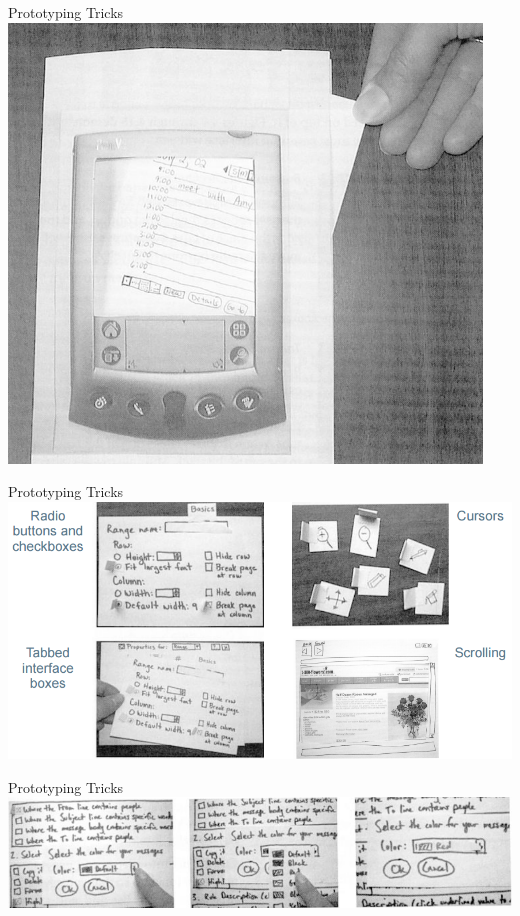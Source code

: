 \documentclass[10pt]{beamer}
\begin{document}
\begin{frame}{Prototyping Tricks}
\centering
	\includegraphics[width=\linewidth]{img/pagessketch.png}
\end{frame}

\begin{frame}{Prototyping Tricks}
\centering
	\includegraphics[width=\linewidth]{img/sketchtricks.png}
\end{frame}

\begin{frame}{Prototyping Tricks}
\centering
	\includegraphics[width=\linewidth]{img/dropdown.png}
\end{frame}
\end{document}
